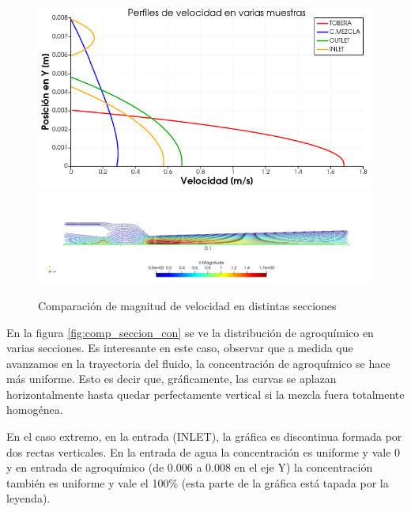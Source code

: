 \documentclass{article}
\begin{document}
\begin{figure}[h!]
	\centering
	\includegraphics[width=1\textwidth]{Figuras/08_COMP_VELOCIDAD.png}
	\includegraphics[width=1\textwidth]{Figuras/08_VELOCIDAD_STREAM.png}
	\caption{Comparación de magnitud de velocidad en distintas secciones}
	\label{fig:comp_seccion_vel}
\end{figure}

En la figura \ref{fig:comp_seccion_con} se ve la distribución de agroquímico en varias secciones. Es interesante en este caso, observar que a medida que avanzamos en la trayectoria del fluido, la concentración de agroquímico se hace más uniforme. Esto es decir que, gráficamente, las curvas se aplazan horizontalmente hasta quedar perfectamente vertical si la mezcla fuera totalmente homogénea.

En el caso extremo, en la entrada (INLET), la gráfica es discontinua formada por dos rectas verticales. En la entrada de agua la concentración es uniforme y vale 0 y en entrada de agroquímico (de 0.006 a 0.008 en el eje Y) la concentración también es uniforme y vale el 100\% (esta parte de la gráfica está tapada por la leyenda).
\end{document}
